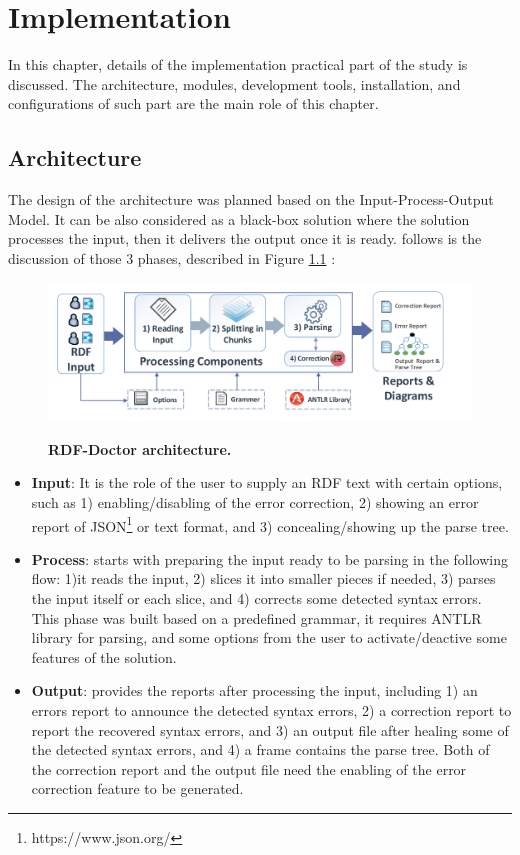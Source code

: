\chapter{Implementation}
\label{ch:implementation}


In this chapter, details of the implementation practical part of the study is discussed. The architecture, modules, development tools, installation, and configurations of such part are the main role of this chapter.  
 
\section {Architecture}
The design of the architecture was planned based on the Input-Process-Output Model. It can be also considered as a black-box solution where the solution processes the input, then it delivers the output once it is ready. follows is the discussion of those 3 phases, described in Figure \ref{Fig:Architecture} : 
 \begin{figure}[ht]
	\begin{center}
		\includegraphics[scale=0.5]{images/architecture.pdf}
		\caption{\textbf{RDF-Doctor architecture.}}
				\setlength\abocaptionskip{-7mm}
		\setlength\belowcaptionskip{-7mm}
		\label{Fig:Architecture}
	\end{center}
\end{figure}

 \begin{itemize}
 \item \textbf {Input}: It is the role of the user to supply an RDF text with certain options, such as 1) enabling/disabling of the error correction, 2) showing an error report of JSON\footnote{https://www.json.org/} or text format, and 3) concealing/showing up the parse tree.
\item \textbf{Process}: starts with preparing the input ready to be parsing in the following flow: 1)it reads the input, 2) slices it into smaller pieces if needed, 3) parses the input itself or each slice, and 4) corrects some detected syntax errors. This phase was built based on a predefined grammar, it requires ANTLR library for parsing, and some options from the user to activate/deactive some features of the solution.   
\item \textbf{Output}: provides the reports after processing the input, including 1) an errors report to announce the detected syntax errors, 2) a correction report to report the recovered syntax errors, and 3) an output file after healing some of the detected syntax errors, and 4) a frame contains the parse tree. Both of the correction report and the output file need the enabling of the error correction feature to be generated. 
\end{itemize}



